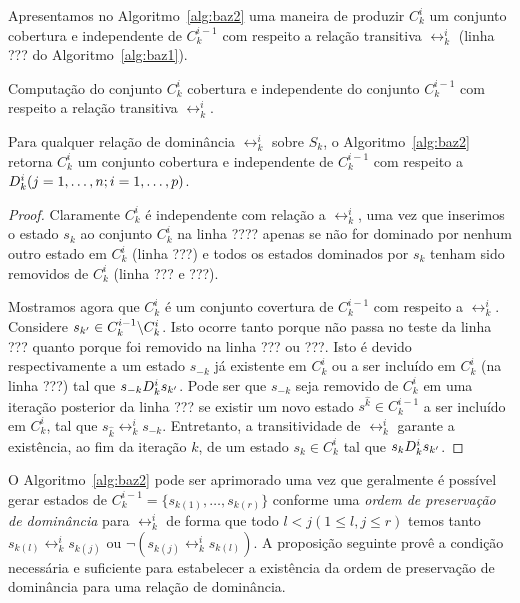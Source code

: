 Apresentamos no Algoritmo~\ref{alg:baz2} uma maneira de produzir $C_k^i$ um
conjunto cobertura e independente de $C_k^{i-1}$ com respeito a relação
transitiva $\rel_k^i$ (linha ??? do Algoritmo~\ref{alg:baz1}).

\begin{algorithm}
  \caption{Computação do conjunto $C_k^i$ cobertura e independente do conjunto
  $C_k^{i-1}$ com respeito a relação transitiva $\rel_k^i$.}
  \label{alg:baz2}
  
\end{algorithm}

\begin{myprop}
  Para qualquer relação de dominância $\rel_k^i$ sobre $S_k$, o
  Algoritmo~\ref{alg:baz2} retorna $C_k^i$ um conjunto cobertura e independente
  de $C_k^{i-1}$ com respeito a $D_k^i (j = 1, \ldots, n; i = 1, \ldots, p)$.
\end{myprop}

\begin{proof}
  Claramente $C_k^i$ é independente com relação a $\rel_k^i$, uma vez que
  inserimos o estado $s_k$ ao conjunto $C_k^i$ na linha ????
  apenas se não for dominado por nenhum outro estado em $C_k^i$ (linha ???)
  e todos os estados dominados por $s_k$ tenham sido removidos de $C_k^i$
  (linha ??? e ???).

  Mostramos agora que $C_k^i$ é um conjunto covertura de $C_k^{i-1}$
  com respeito a $\rel_k^i$.
  Considere $s_{{k'}} \in C_k^{i-1} \backslash C_k^i$.
  Isto ocorre tanto porque não passa no teste da linha ??? quanto porque
  foi removido na linha ??? ou ???.
  Isto é devido respectivamente a um estado $s_{-k}$ já existente em $C_k^i$
  ou a ser incluído em $C_k^i$ (na linha ???) tal que $s_{-k}D_k^i s_{{k'}}$.
  Pode ser que $s_{-k}$ seja removido de $C_k^i$ em uma iteração posterior
  da linha ??? se existir um novo estado $s^{\hat k} \in C_k^{i-1}$ a ser
  incluído em $C_k^i$, tal que $s_{\hat k} \rel_k^i s_{-k}$.
  Entretanto, a transitividade de $\rel_k^i$ garante a existência, ao fim da
  iteração $k$, de um estado $s_k \in C_k^i$ tal que $s_k D_k^i s_{{k'}}$.
  \qedhere
\end{proof}

O Algoritmo~\ref{alg:baz2} pode ser aprimorado uma vez que geralmente é possível
gerar estados de $C_k^{i-1} = \{s_{k(1)}, \ldots, s_{k(r)}\}$ conforme
uma \emph{ordem de preservação de dominância} para $\rel_k^i$ de forma que
todo $l < j (1 \leq l, j \leq r)$ temos tanto $s_{k(l)} \rel_k^i s_{k(j)}$
ou $\neg (s_{k(j)} \rel_k^i s_{k(l)})$.
A proposição seguinte provê a condição necessária e suficiente para estabelecer
a existência da ordem de preservação de dominância para uma relação de dominância.

